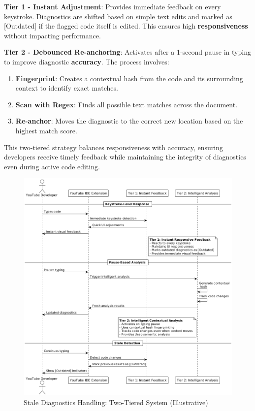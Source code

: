 \begin{spacing}{1.2}
\textbf{Tier 1 - Instant Adjustment}: Provides immediate feedback on every keystroke. Diagnostics are shifted based on simple text edits and marked as [Outdated] if the flagged code itself is edited. This ensures high \textbf{responsiveness} without impacting performance.  

\textbf{Tier 2 - Debounced Re-anchoring}: Activates after a 1-second pause in typing to improve diagnostic \textbf{accuracy}. The process involves:  
\begin{enumerate}
    \item \textbf{Fingerprint}: Creates a contextual hash from the code and its surrounding context to identify exact matches.  
    \item \textbf{Scan with Regex}: Finds all possible text matches across the document.  
    \item \textbf{Re-anchor}: Moves the diagnostic to the correct new location based on the highest match score.  
\end{enumerate}  
This two-tiered strategy balances responsiveness with accuracy, ensuring developers receive timely feedback while maintaining the integrity of diagnostics even during active code editing.


\begin{figure}[H]
    \centering
    \includegraphics[scale=0.55]{Images/stale_diagnostics.png}
    \caption{Stale Diagnostics Handling: Two-Tiered System (Illustrative)}
    \label{fig:stale_diagnostics_method}
\end{figure}


\end{spacing}
